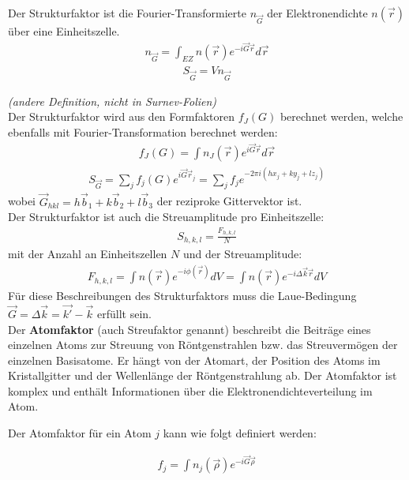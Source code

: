 Der Strukturfaktor ist die Fourier-Transformierte $n_{\Vec{G}}$ der Elektronendichte $ n(\vec{r})$ über eine Einheitszelle. 
\begin{align}
n_{\vec{G}} = \int _{EZ} n(\vec{r}) e^{-i \vec{G} \vec{r}} d\vec{r} 
\end{align}
\begin{align}
S_{\vec{G}} = V n_{\vec{G}} 
\end{align} \medskip


\textit{(andere Definition, nicht in Surnev-Folien)} \\
Der Strukturfaktor wird aus den Formfaktoren $f_J(G)$ berechnet werden, welche ebenfalls mit Fourier-Transformation berechnet werden:
\begin{align}
f_J(G) = \int n_J(\vec{r}) e^{i \vec{G} \vec{r}} d\vec{r}
\end{align}
\begin{align}
S_{\vec{G}} = \sum_j f_j (G) e^{i \vec{G} \vec{r}_j} = \sum_j f_j e^{-2 \pi i (hx_j + ky_j + l z_j)}
\end{align}
wobei $\vec{G}_{hkl} = h\vec{b}_1+k\vec{b}_2+l\vec{b}_3$ der reziproke Gittervektor ist. \\




Der Strukturfaktor ist auch die Streuamplitude pro Einheitszelle:
\begin{align}
S_{h,k,l} = \frac{F_{h,k,l}}{N}
\end{align}
mit der Anzahl an Einheitszellen $N$ und der Streuamplitude:
\begin{align}
    F_{h,k,l} = \int n(\vec{r}) e^{-i \phi(\vec{r})} dV = \int n(\vec{r}) e^{-i \Delta \vec{k} \vec{r}} dV
\end{align}
Für diese Beschreibungen des Strukturfaktors muss die Laue-Bedingung $\vec{G} = \Delta \vec{k} = \vec{k'}-\vec{k}$ erfüllt sein. \bigskip \\

Der \textbf{Atomfaktor} (auch Streufaktor genannt) beschreibt die Beiträge eines einzelnen Atoms zur Streuung von Röntgenstrahlen bzw. das Streuvermögen der einzelnen Basisatome. Er hängt von der Atomart, der Position des Atoms im Kristallgitter und der Wellenlänge der Röntgenstrahlung ab. Der Atomfaktor ist komplex und enthält Informationen über die Elektronendichteverteilung im Atom.

Der Atomfaktor für ein Atom $j$ kann  wie folgt definiert werden:

\begin{align}
f_j = \int n_j (\vec{\rho}) e^{-i \vec{G} \vec{\rho}}
\end{align}

